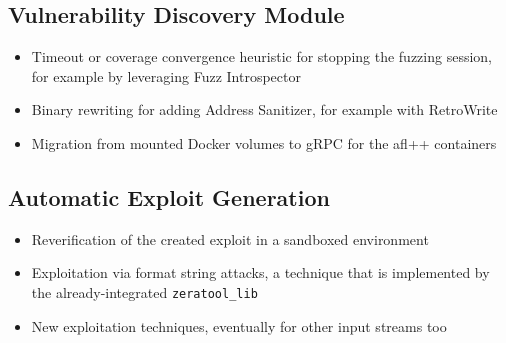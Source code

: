 \documentclass[../main.tex]{subfiles}
\begin{document}
\hypertarget{vulnerability-discovery-module}{%
  \subsection{Vulnerability Discovery
    Module}\label{vulnerability-discovery-module}}

\begin{itemize}
  \tightlist
  \item
        Timeout or coverage convergence heuristic for stopping the fuzzing
        session, for example by leveraging Fuzz Introspector
  \item
        Binary rewriting for adding Address Sanitizer, for example with
        RetroWrite
  \item
        Migration from mounted Docker volumes to gRPC for the afl++ containers
\end{itemize}

\hypertarget{automatic-exploit-generation}{%
  \subsection{Automatic Exploit
    Generation}\label{automatic-exploit-generation}}

\begin{itemize}
  \tightlist
  \item
        Reverification of the created exploit in a sandboxed environment
  \item
        Exploitation via format string attacks, a technique that is
        implemented by the already-integrated \texttt{zeratool\_lib}
  \item
        New exploitation techniques, eventually for other input streams too
\end{itemize}
\end{document}
